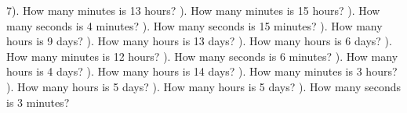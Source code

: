 \documentclass{article}%
\begin{document}
7). How many minutes is 13 hours?%
\newline%
\newline%
). How many minutes is 15 hours?%
\newline%
\newline%
). How many seconds is 4 minutes?%
\newline%
\newline%
). How many seconds is 15 minutes?%
\newline%
\newline%
). How many hours is 9 days?%
\newline%
\newline%
). How many hours is 13 days?%
\newline%
\newline%
). How many hours is 6 days?%
\newline%
\newline%
). How many minutes is 12 hours?%
\newline%
\newline%
). How many seconds is 6 minutes?%
\newline%
\newline%
). How many hours is 4 days?%
\newline%
\newline%
). How many hours is 14 days?%
\newline%
\newline%
). How many minutes is 3 hours?%
\newline%
\newline%
). How many hours is 5 days?%
\newline%
\newline%
). How many hours is 5 days?%
\newline%
\newline%
). How many seconds is 3 minutes?%
\end{document}
